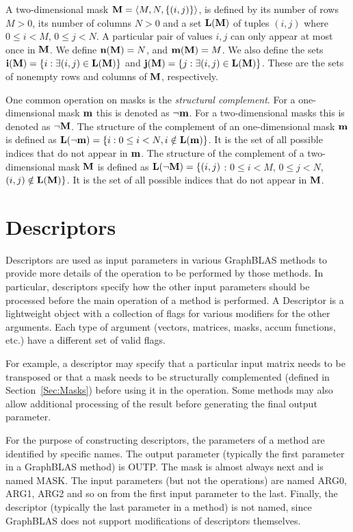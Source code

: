 A two-dimensional mask ${\bf M} = \langle M, N, \{ (i,j) \} \rangle$,
is defined by its number of rows $M>0$, its number of columns
$N>0$ and a set $\bold{L}({\bf M})$ of tuples $(i,j)$ where $0 \leq i < M$, $0 \leq
j < N$.   A particular pair of values $i,j$ can only
appear at most once in ${\bf M}$.  We define $\bold{n}({\bf M})
= N$, and $\bold{m}({\bf M}) = M$.  
We also define the sets ${\bf i({\bf M})} = \{
i : \exists (i,j) \in \bold{L}({\bf M}) \}$ and ${\bf j({\bf M})}
= \{ j : \exists (i,j) \in \bold{L}({\bf M}) \}$.  These are the sets
of nonempty rows and columns of ${\bf M}$, respectively.

One common operation on masks is the \emph{structural complement}.  For a one-dimensional mask ${\bf m}$ this
is denoted as $\neg{\bf m}$. For a two-dimensional
masks this is denoted as $\neg{\bf M}$.
The structure of the complement of an one-dimensional mask ${\bf m}$ is
defined as $\bold{L}(\neg{\bf m}) = \{i : 0 \leq i < N, i \notin \bold{L}({\bf m}) \}$.
It is the set of all possible indices that do not appear in ${\bf m}$.
The structure of the complement of a two-dimensional mask ${\bf M}$ is
defined as $\bold{L}(\neg{\bf M}) = \{(i,j)$ : $0 \leq i < M$, $0 \leq
j < N$, $(i,j) \notin \bold{L}({\bf M}) \}$.  It is the set of all possible
indices that do not appear in ${\bf M}$.

\section{Descriptors}

Descriptors are used as input parameters in various GraphBLAS methods to
provide more details of the operation to be performed by those methods.
In particular, descriptors specify how the other input parameters
should be processed before the main operation of a method is performed.
A Descriptor is a lightweight object with a collection of flags
for various modifiers for the other arguments.  Each type of argument
(vectors, matrices, masks, accum functions, etc.) have a different set of
valid flags.

For example, a descriptor may specify that a particular input matrix
needs to be transposed or that a mask needs to be structurally complemented 
(defined in Section~\ref{Sec:Masks})
before using it in the operation.  Some methods may also allow additional
processing of the result before generating the final output parameter.

For the purpose of constructing descriptors, the parameters of a method
are identified by specific names. The output parameter (typically
the first parameter in a GraphBLAS method) is {\sf OUTP}.  The mask is 
almost always next and is named {\sf MASK}. The input parameters (but
not the operations) are named {\sf ARG0}, {\sf ARG1}, {\sf ARG2} and so 
on from the first input parameter to the last. Finally, the descriptor
(typically the last parameter in a method) is not named, since GraphBLAS
does not support modifications of descriptors themselves.

